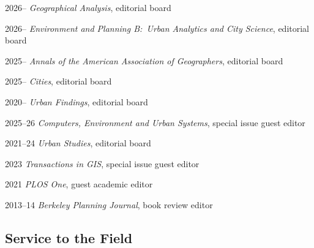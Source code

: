 \documentclass[11pt,letterpaper]{report} %
\begin{document}
\begin{tablist}

\item[2026--]   \tab{}\textit{Geographical Analysis}, editorial board
\item[2026--]   \tab{}\textit{Environment and Planning B:\ Urban Analytics and City Science}, editorial board
\item[2025--]   \tab{}\textit{Annals of the American Association of Geographers}, editorial board
\item[2025--]   \tab{}\textit{Cities}, editorial board
\item[2020--]   \tab{}\textit{Urban Findings}, editorial board
\item[2025--26] \tab{}\textit{Computers, Environment and Urban Systems}, special issue guest editor  %
\item[2021--24] \tab{}\textit{Urban Studies}, editorial board
\item[2023]     \tab{}\textit{Transactions in GIS}, special issue guest editor  %
\item[2021]     \tab{}\textit{PLOS One}, guest academic editor
\item[2013--14] \tab{}\textit{Berkeley Planning Journal}, book review editor

\end{tablist}

\subsection*{Service to the Field}
\end{document}
